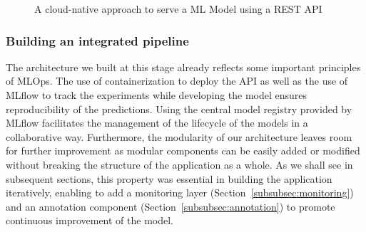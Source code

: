 \documentclass[graybox]{svmult}
\begin{document}
\begin{figure}[htbp]
    \centering
    \caption{A cloud-native approach to serve a ML Model using a REST API}
    \label{fig:api-datalab}
\end{figure}

\subsubsection{Building an integrated pipeline}

The architecture we built at this stage already reflects some important principles of MLOps. The use of containerization to deploy the API as well as the use of MLflow to track the experiments while developing the model ensures reproducibility of the predictions. Using the central model registry provided by MLflow facilitates the management of the lifecycle of the models in a collaborative way. Furthermore, the modularity of our architecture leaves room for further improvement as modular components can be easily added or modified without breaking the structure of the application as a whole. As we shall see in subsequent sections, this property was essential in building the application iteratively, enabling to add a monitoring layer (Section~\ref{subsubsec:monitoring}) and an annotation component (Section~\ref{subsubsec:annotation}) to promote continuous improvement of the model.
\end{document}
